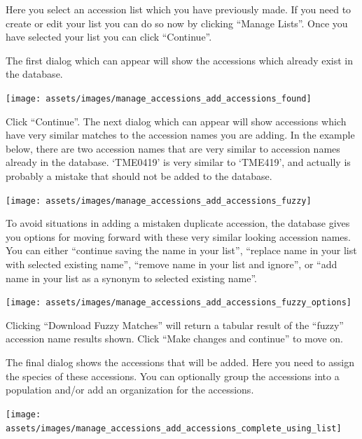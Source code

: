 \documentclass[
  12pt,
]{book}
\begin{document}
Here you select an accession list which you have previously made. If you need to create or edit your list you can do so now by clicking ``Manage Lists''. Once you have selected your list you can click ``Continue''.

The first dialog which can appear will show the accessions which already exist in the database.

\begin{center}\texttt{[image: assets/images/manage\_accessions\_add\_accessions\_found]} \end{center}

Click ``Continue''. The next dialog which can appear will show accessions which have very similar matches to the accession names you are adding. In the example below, there are two accession names that are very similar to accession names already in the database. `TME0419' is very similar to `TME419', and actually is probably a mistake that should not be added to the database.

\begin{center}\texttt{[image: assets/images/manage\_accessions\_add\_accessions\_fuzzy]} \end{center}

To avoid situations in adding a mistaken duplicate accession, the database gives you options for moving forward with these very similar looking accession names. You can either ``continue saving the name in your list'', ``replace name in your list with selected existing name'', ``remove name in your list and ignore'', or ``add name in your list as a synonym to selected existing name''.

\begin{center}\texttt{[image: assets/images/manage\_accessions\_add\_accessions\_fuzzy\_options]} \end{center}

Clicking ``Download Fuzzy Matches'' will return a tabular result of the ``fuzzy'' accession name results shown. Click ``Make changes and continue'' to move on.

The final dialog shows the accessions that will be added. Here you need to assign the species of these accessions. You can optionally group the accessions into a population and/or add an organization for the accessions.

\begin{center}\texttt{[image: assets/images/manage\_accessions\_add\_accessions\_complete\_using\_list]} \end{center}
\end{document}
